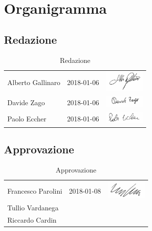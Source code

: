 \appendix
\section{Organigramma}
	\subsection{Redazione}
	\begin{table}[H]
	\centering
	\begin{tabular}{|p{4cm}|C{4cm}|C{5cm}|}
	\hline
		 & & \\
		\hline	
		Alberto Gallinaro & 2018-01-06 & \includegraphics[width=2cm]{../../CommonImages/firme/alberto.png}  \\
		\hline
		Davide Zago & 2018-01-06 & \includegraphics[width=2cm]{../../CommonImages/firme/davide.png} \\
		\hline
		Paolo Eccher & 2018-01-06 & \includegraphics[width=2cm]{../../CommonImages/firme/paolo.png} \\
		\hline
	\end{tabular}
	\caption{Redazione}
	\end{table}
	
	\subsection{Approvazione}
	\begin{table}[H]
		\centering
		\begin{tabular}{|p{4cm}|C{4cm}|C{5cm}|}
			\hline
			 & & \\
			\hline			
			Francesco Parolini & 2018-01-08 & \includegraphics[width=2cm]{../../CommonImages/firme/freppo.png}  \\
			\hline
			Tullio Vardanega &  &  \\
			\hline
			Riccardo Cardin &  &  \\
			\hline
		\end{tabular}
		\caption{Approvazione}
	\end{table}
	
